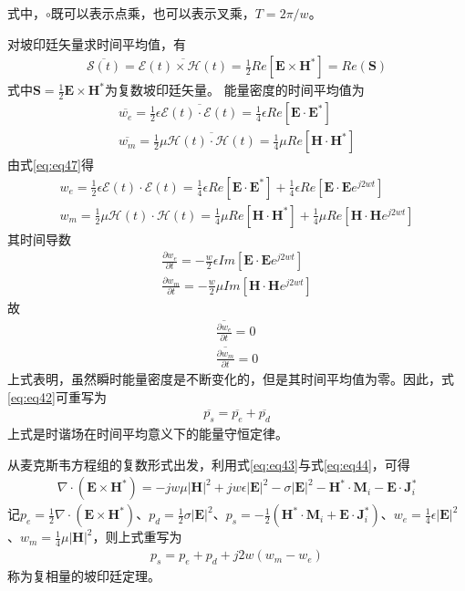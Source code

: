 \documentclass{article}
\numberwithin{equation}{section}
\renewcommand{\vec}[1]{\boldsymbol{#1}}
\begin{document}
式中，$\circ$既可以表示点乘，也可以表示叉乘，$T=2\pi/w$。\par
对坡印廷矢量求时间平均值，有
\begin{align}
    \overline{\vec{\mathcal{S}}(t)}=\overline{\vec{\mathcal{E}}(t) \times \vec{\mathcal{H}}(t)}=\frac{1}{2}Re[\mathbf{E}\times \mathbf{H}^*]=Re(\mathbf{S})
\end{align}
式中$\mathbf{S}=\frac{1}{2}\mathbf{E}\times \mathbf{H}^*$为复数坡印廷矢量。
能量密度的时间平均值为
\begin{align}
    \overline{w_e}=\frac{1}{2}\epsilon \overline{\vec{\mathcal{E}}(t)\cdot \vec{\mathcal{E}}(t)}=\frac{1}{4}\epsilon Re[\mathbf{E}\cdot \mathbf{E}^*] \\
    \overline{w_m}=\frac{1}{2}\mu \overline{\vec{\mathcal{H}}(t)\cdot \vec{\mathcal{H}}(t)}=\frac{1}{4}\mu Re[\mathbf{H}\cdot \mathbf{H}^*]
\end{align}
由式\ref{eq:eq47}得
\begin{align}
    w_e=\frac{1}{2}\epsilon \vec{\mathcal{E}}(t)\cdot \vec{\mathcal{E}}(t)=\frac{1}{4}\epsilon Re[\mathbf{E}\cdot \mathbf{E}^*]+\frac{1}{4}\epsilon Re[\mathbf{E}\cdot \mathbf{E}e^{j2wt}] \\
    w_m=\frac{1}{2}\mu      \vec{\mathcal{H}}(t)\cdot \vec{\mathcal{H}}(t)=\frac{1}{4}\mu      Re[\mathbf{H}\cdot \mathbf{H}^*]+\frac{1}{4}\mu      Re[\mathbf{H}\cdot \mathbf{H}e^{j2wt}]
\end{align}
其时间导数
\begin{align}
    \frac{\partial w_e}{\partial t}=-\frac{w}{2}\epsilon Im[\mathbf{E}\cdot \mathbf{E}e^{j2wt}] \\
    \frac{\partial w_m}{\partial t}=-\frac{w}{2}\mu      Im[\mathbf{H}\cdot \mathbf{H}e^{j2wt}]
\end{align}
故
\begin{align}
    \overline{\frac{\partial w_e}{\partial t}}=0 \\
    \overline{\frac{\partial w_m}{\partial t}}=0
\end{align}
上式表明，虽然瞬时能量密度是不断变化的，但是其时间平均值为零。因此，式\ref{eq:eq42}可重写为
\begin{align}
    \overline{p_s}=\overline{p_e}+\overline{p_d}
\end{align}
上式是时谐场在时间平均意义下的能量守恒定律。\par
从麦克斯韦方程组的复数形式出发，利用式\ref{eq:eq43}与式\ref{eq:eq44}，可得
\begin{align}
    \nabla \cdot (\mathbf{E}\times \mathbf{H}^*)=-jw\mu|\mathbf{H}|^2+jw\epsilon |\mathbf{E}|^2-\sigma |\mathbf{E}|^2-\mathbf{H}^*\cdot \mathbf{M}_i-\mathbf{E}\cdot \mathbf{J}_i^*
\end{align}
记$p_e=\frac{1}{2}\nabla \cdot (\mathbf{E}\times \mathbf{H}^*)$、$p_d=\frac{1}{2}\sigma |\mathbf{E}|^2$、$p_s=-\frac{1}{2}(\mathbf{H}^*\cdot \mathbf{M}_i+\mathbf{E}\cdot \mathbf{J}_i^*)$、$w_e=\frac{1}{4}\epsilon |\mathbf{E}|^2$、$w_m=\frac{1}{4}\mu|\mathbf{H}|^2$，则上式重写为
\begin{align}
    p_s=p_e+p_d+j2w(w_m-w_e)
\end{align}
称为复相量的坡印廷定理。
\end{document}
